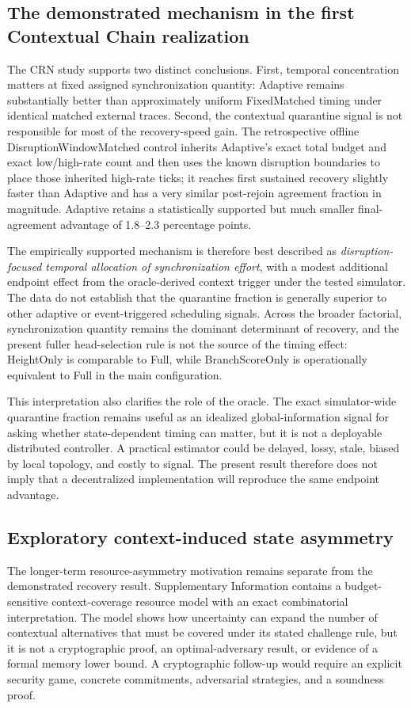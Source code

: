 \documentclass[11pt]{article}
\begin{document}
\subsection{The demonstrated mechanism in the first Contextual Chain realization}
The CRN study supports two distinct conclusions. First, temporal concentration matters at fixed assigned synchronization quantity: Adaptive remains substantially better than approximately uniform FixedMatched timing under identical matched external traces. Second, the contextual quarantine signal is not responsible for most of the recovery-speed gain. The retrospective offline DisruptionWindowMatched control inherits Adaptive's exact total budget and exact low/high-rate count and then uses the known disruption boundaries to place those inherited high-rate ticks; it reaches first sustained recovery slightly faster than Adaptive and has a very similar post-rejoin agreement fraction in magnitude. Adaptive retains a statistically supported but much smaller final-agreement advantage of 1.8--2.3 percentage points.

The empirically supported mechanism is therefore best described as \emph{disruption-focused temporal allocation of synchronization effort}, with a modest additional endpoint effect from the oracle-derived context trigger under the tested simulator. The data do not establish that the quarantine fraction is generally superior to other adaptive or event-triggered scheduling signals. Across the broader factorial, synchronization quantity remains the dominant determinant of recovery, and the present fuller head-selection rule is not the source of the timing effect: HeightOnly is comparable to Full, while BranchScoreOnly is operationally equivalent to Full in the main configuration.

This interpretation also clarifies the role of the oracle. The exact simulator-wide quarantine fraction remains useful as an idealized global-information signal for asking whether state-dependent timing can matter, but it is not a deployable distributed controller. A practical estimator could be delayed, lossy, stale, biased by local topology, and costly to signal. The present result therefore does not imply that a decentralized implementation will reproduce the same endpoint advantage.

\subsection{Exploratory context-induced state asymmetry}
The longer-term resource-asymmetry motivation remains separate from the demonstrated recovery result. Supplementary Information contains a budget-sensitive context-coverage resource model with an exact combinatorial interpretation. The model shows how uncertainty can expand the number of contextual alternatives that must be covered under its stated challenge rule, but it is not a cryptographic proof, an optimal-adversary result, or evidence of a formal memory lower bound. A cryptographic follow-up would require an explicit security game, concrete commitments, adversarial strategies, and a soundness proof.
\end{document}
